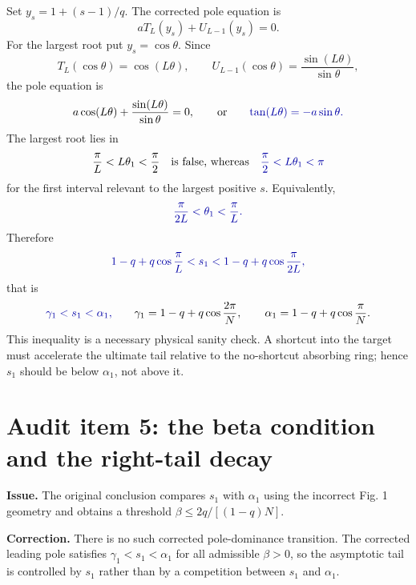 \documentclass[11pt]{article}
\newcommand{\Corrected}[1]{\textcolor{blue!65!black}{#1}}
\newcommand{\Issue}[1]{\par\medskip\noindent\textbf{Issue.} #1\par}
\newcommand{\Fix}[1]{\par\noindent\textbf{Correction.} #1\par}
\begin{document}
Set $y_s=1+(s-1)/q$.  The corrected pole equation is
\begin{equation}
  aT_L(y_s)+U_{L-1}(y_s)=0.
\end{equation}
For the largest root put $y_s=\cos\theta$.  Since
\begin{equation}
  T_L(\cos\theta)=\cos(L\theta),
  \qquad
  U_{L-1}(\cos\theta)=\frac{\sin(L\theta)}{\sin\theta},
\end{equation}
the pole equation is
\begin{equation}
  a\cos(L\theta)+\frac{\sin(L\theta)}{\sin\theta}=0,
  \qquad\text{or}\qquad
  \Corrected{\tan(L\theta)=-a\sin\theta.}
\end{equation}
The largest root lies in
\begin{equation}
  \frac{\pi}{L}<L\theta_1<\frac{\pi}{2}
  \quad\text{is false, whereas}\quad
  \Corrected{\frac{\pi}{2}<L\theta_1<\pi}
\end{equation}
for the first interval relevant to the largest positive $s$.  Equivalently,
\begin{equation}
  \Corrected{\frac{\pi}{2L}<\theta_1<\frac{\pi}{L}.}
\end{equation}
Therefore
\begin{equation}
  \Corrected{1-q+q\cos\frac{\pi}{L}<s_1<1-q+q\cos\frac{\pi}{2L},}
\end{equation}
that is
\begin{equation}
  \Corrected{\gamma_1<s_1<\alpha_1,}
  \qquad
  \gamma_1=1-q+q\cos\frac{2\pi}{N},
  \qquad
  \alpha_1=1-q+q\cos\frac{\pi}{N}.
\end{equation}
This inequality is a necessary physical sanity check.  A shortcut into the target must accelerate
the ultimate tail relative to the no-shortcut absorbing ring; hence $s_1$ should be below
$\alpha_1$, not above it.

\section{Audit item 5: the beta condition and the right-tail decay}

\Issue{The original conclusion compares $s_1$ with $\alpha_1$ using the incorrect Fig. 1 geometry
and obtains a threshold $\beta\le 2q/[(1-q)N]$.}

\Fix{There is no such corrected pole-dominance transition.  The corrected leading pole satisfies
$\gamma_1<s_1<\alpha_1$ for all admissible $\beta>0$, so the asymptotic tail is controlled by
$s_1$ rather than by a competition between $s_1$ and $\alpha_1$.}
\end{document}
